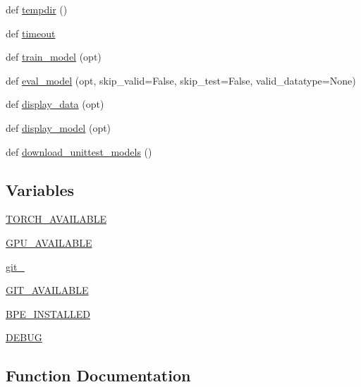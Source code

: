 \begin{DoxyCompactItemize}
\item 
def \hyperlink{namespaceparlai_1_1utils_1_1testing_a0945b769a10c0c844b29c02ff26445a5}{tempdir} ()
\item 
def \hyperlink{namespaceparlai_1_1utils_1_1testing_aa8539ab1d17813b0c17f08700b2c2c2e}{timeout}
\item 
def \hyperlink{namespaceparlai_1_1utils_1_1testing_a005734981469efed8a992bf5edc3ca8a}{train\+\_\+model} (opt)
\item 
def \hyperlink{namespaceparlai_1_1utils_1_1testing_ab5bd02c7b5ab42c393ddddf73d9c78d2}{eval\+\_\+model} (opt, skip\+\_\+valid=False, skip\+\_\+test=False, valid\+\_\+datatype=None)
\item 
def \hyperlink{namespaceparlai_1_1utils_1_1testing_a30c532f112f9beddd873382e649b3ecd}{display\+\_\+data} (opt)
\item 
def \hyperlink{namespaceparlai_1_1utils_1_1testing_a1b41200277931b2e4e684dc9452889a9}{display\+\_\+model} (opt)
\item 
def \hyperlink{namespaceparlai_1_1utils_1_1testing_ae0c93fc8f4c3e079333dba0065fa4dd2}{download\+\_\+unittest\+\_\+models} ()
\end{DoxyCompactItemize}
\subsection*{Variables}
\begin{DoxyCompactItemize}
\item 
\hyperlink{namespaceparlai_1_1utils_1_1testing_a490429a10abf78b127acf5c8d05fe6a3}{T\+O\+R\+C\+H\+\_\+\+A\+V\+A\+I\+L\+A\+B\+LE}
\item 
\hyperlink{namespaceparlai_1_1utils_1_1testing_a684675b731fae330593a7817c8649f27}{G\+P\+U\+\_\+\+A\+V\+A\+I\+L\+A\+B\+LE}
\item 
\hyperlink{namespaceparlai_1_1utils_1_1testing_aee12f734544cd8a3dcb1c823aa51b2f0}{git\+\_\+}
\item 
\hyperlink{namespaceparlai_1_1utils_1_1testing_a86172d8df39b9bd5f1df6d5d40cbcb84}{G\+I\+T\+\_\+\+A\+V\+A\+I\+L\+A\+B\+LE}
\item 
\hyperlink{namespaceparlai_1_1utils_1_1testing_a3fb33ee5ae900d21c17886956cbe607a}{B\+P\+E\+\_\+\+I\+N\+S\+T\+A\+L\+L\+ED}
\item 
\hyperlink{namespaceparlai_1_1utils_1_1testing_aefdde322d186e6a1136a5ca864048280}{D\+E\+B\+UG}
\end{DoxyCompactItemize}


\subsection{Function Documentation}
\mbox{\label{namespaceparlai_1_1utils_1_1testing_ab00d4d693202afab92c06387aa50699b}} 
